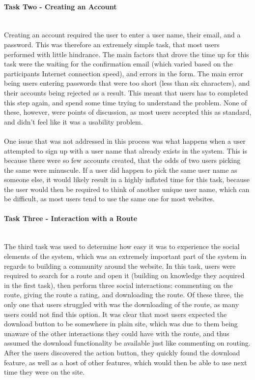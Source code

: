 \paragraph{Task Two - Creating an Account}\ \\
Creating an account required the user to enter a user name, their email, and a password. This was therefore an extremely simple task, that most users performed with little hindrance. The main factors that drove the time up for this task were the waiting for the confirmation email (which varied based on the participants Internet connection speed), and errors in the form. The main error being users entering passwords that were too short (less than six characters), and their accounts being rejected as a result. This meant that users has to completed this step again, and spend some time trying to understand the problem. None of these, however, were points of discussion, as most users accepted this as standard, and didn't feel like it was a usability problem.\ \\
\ \\
One issue that was not addressed in this process was what happens when a user attempted to sign up with a user name that already exists in the system. This is because there were so few accounts created, that the odds of two users picking the same were minuscule. If a user did happen to pick the same user name as someone else, it would likely result in a highly inflated time for this task, because the user would then be required to think of another unique user name, which can be difficult, as most users tend to use the same one for most websites. 

\paragraph{Task Three - Interaction with a Route}\ \\
The third task was used to determine how easy it was to experience the social elements of the system, which was an extremely important part of the system in regards to building a community around the website. In this task, users were required to search for a route and open it (building on knowledge they acquired in the first task), then perform three social interactions: commenting on the route, giving the route a rating, and downloading the route. Of these three, the only one that users struggled with was the downloading of the route, as many users could not find this option. It was clear that most users expected the download button to be somewhere in plain site, which was due to them being unaware of the other interactions they could have with the route, and thus assumed the download functionality be available just like commenting on routing. After the users discovered the action button, they quickly found the download feature, as well as a host of other features, which would then be able to use next time they were on the site.
\ \\
